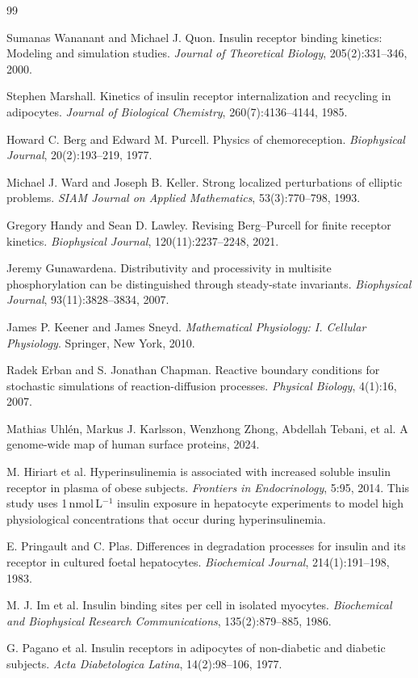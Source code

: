 \begin{thebibliography}{99}

 Sumanas Wananant and Michael J. Quon. Insulin receptor binding kinetics: Modeling and simulation studies. \textit{Journal of Theoretical Biology}, 205(2):331--346, 2000.

 Stephen Marshall. Kinetics of insulin receptor internalization and recycling in adipocytes. \textit{Journal of Biological Chemistry}, 260(7):4136--4144, 1985.

 Howard C. Berg and Edward M. Purcell. Physics of chemoreception. \textit{Biophysical Journal}, 20(2):193--219, 1977.

 Michael J. Ward and Joseph B. Keller. Strong localized perturbations of elliptic problems. \textit{SIAM Journal on Applied Mathematics}, 53(3):770--798, 1993.

 Gregory Handy and Sean D. Lawley. Revising Berg--Purcell for finite receptor kinetics. \textit{Biophysical Journal}, 120(11):2237--2248, 2021.

 Jeremy Gunawardena. Distributivity and processivity in multisite phosphorylation can be distinguished through steady-state invariants. \textit{Biophysical Journal}, 93(11):3828--3834, 2007.

 James P. Keener and James Sneyd. \textit{Mathematical Physiology: I. Cellular Physiology}. Springer, New York, 2010.

 Radek Erban and S. Jonathan Chapman. Reactive boundary conditions for stochastic simulations of reaction-diffusion processes. \textit{Physical Biology}, 4(1):16, 2007.

 Mathias Uhl\'en, Markus J. Karlsson, Wenzhong Zhong, Abdellah Tebani, et al. A genome-wide map of human surface proteins, 2024.

 M. Hiriart et al. Hyperinsulinemia is associated with increased soluble insulin receptor in plasma of obese subjects. \textit{Frontiers in Endocrinology}, 5:95, 2014. This study uses 1\,nmol\,L$^{-1}$ insulin exposure in hepatocyte experiments to model high physiological concentrations that occur during hyperinsulinemia.

 E. Pringault and C. Plas. Differences in degradation processes for insulin and its receptor in cultured foetal hepatocytes. \textit{Biochemical Journal}, 214(1):191--198, 1983.

 M. J. Im et al. Insulin binding sites per cell in isolated myocytes. \textit{Biochemical and Biophysical Research Communications}, 135(2):879--885, 1986.

 G. Pagano et al. Insulin receptors in adipocytes of non-diabetic and diabetic subjects. \textit{Acta Diabetologica Latina}, 14(2):98--106, 1977.

\end{thebibliography}
